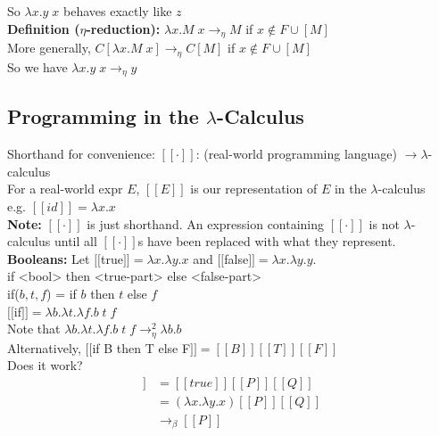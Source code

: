 \documentclass[11pt]{article}
\begin{document}
So $\lambda x.y\;x$ behaves exactly like $z$ \\

\textbf{Definition ($\eta$-reduction):} $\lambda x.M\;x \rightarrow_\eta M$ if $x \notin F \cup [M]$ \\

More generally, $C[\lambda x.M\;x] \rightarrow_\eta C[M]$ if $x \notin F \cup [M]$ \\

So we have $\lambda x.y\;x \rightarrow_\eta y$ \\

\subsection{Programming in the $\lambda$-Calculus}

Shorthand for convenience: $[[\cdot]]$: (real-world programming language) $\rightarrow \lambda$-calculus \\

For a real-world expr $E$, $[[E]]$ is our representation of $E$ in the $\lambda$-calculus \\

e.g. $[[id]] = \lambda x.x$ \\

{\bf Note:} $[[\cdot]]$ is just shorthand. An expression containing $[[\cdot]]$ is not $\lambda$-calculus until all $[[\cdot]]$s have been replaced with what they represent. \\

{\bf Booleans:} Let $[[$true$]] = \lambda x.\lambda y.x$ and $[[$false$]] = \lambda x.\lambda y.y$. \\

if <bool> then <true-part> else <false-part> \\

if($b,t,f$) = if $b$ then $t$ else $f$ \\ 

$[[$if$]] = \lambda b. \lambda t.\lambda f.b\;t\;f$ \\

Note that $\lambda b. \lambda t.\lambda f.b\;t\;f \rightarrow_\eta^2 \lambda b.b$ \\

Alternatively, $[[$if B then T else F$]] = [[B]][[T]][[F]]$ \\

Does it work? \\

\begin{align*}
[[\text{if true then P else Q}]] &= [[true]][[P]][[Q]] \\
&= (\lambda x.\lambda y.x)[[P]][[Q]] \\
&\rightarrow_\beta [[P]]
\end{align*}
\end{document}
